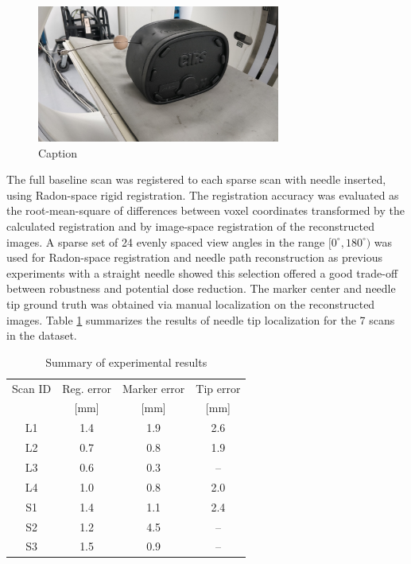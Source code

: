 \documentclass[letterpaper, 11 pt, conference]{ieeeconf}  %
\begin{document}
\begin{figure}[t]
\centering
\includegraphics[width=8cm]{long_needle_phantom.jpg}
\caption{Caption}
\label{figurelabel2}
\end{figure}

The full baseline scan was registered to each sparse scan with needle inserted, using Radon-space rigid registration. The registration accuracy was evaluated as the root-mean-square of differences between voxel coordinates transformed by the calculated registration and by image-space registration of the reconstructed images. 
A sparse set of 24 evenly spaced view angles in the range $[0^\circ,180^\circ)$ was used for Radon-space registration and needle path reconstruction as previous experiments \cite{medan2017reduced} with a straight needle showed this selection offered a good trade-off between robustness and potential dose reduction.
The marker center and needle tip ground truth was obtained via manual localization on the reconstructed images.
Table \ref{results_table} summarizes the results of needle tip localization for the 7 scans in the dataset.

\begin{table}[t]
\caption{Summary of experimental results}
\label{results_table}
\begin{center}
\begin{tabular}{|c||c|c|c|}
\hline
Scan ID & Reg. error & Marker error & Tip error\\
  & [mm] & [mm] & [mm]\\
\hline
\hline
L1 & 1.4 & 1.9 & 2.6\\
\hline
L2 & 0.7 & 0.8 & 1.9\\
\hline
L3 & 0.6 & 0.3 & --\\
\hline
L4 & 1.0 & 0.8 & 2.0\\
\hline
S1 & 1.4 & 1.1 & 2.4\\
\hline
S2 & 1.2 & 4.5 & --\\
\hline
S3 & 1.5 & 0.9 & --\\
\hline
\end{tabular}
\end{center}
\end{table}
\end{document}
